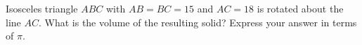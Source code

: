 Isosceles triangle $ABC$ with $AB=BC=15$ and $AC=18$ is rotated about the line $AC$. What is the volume of the resulting solid? Express your answer in terms of $\pi$.
